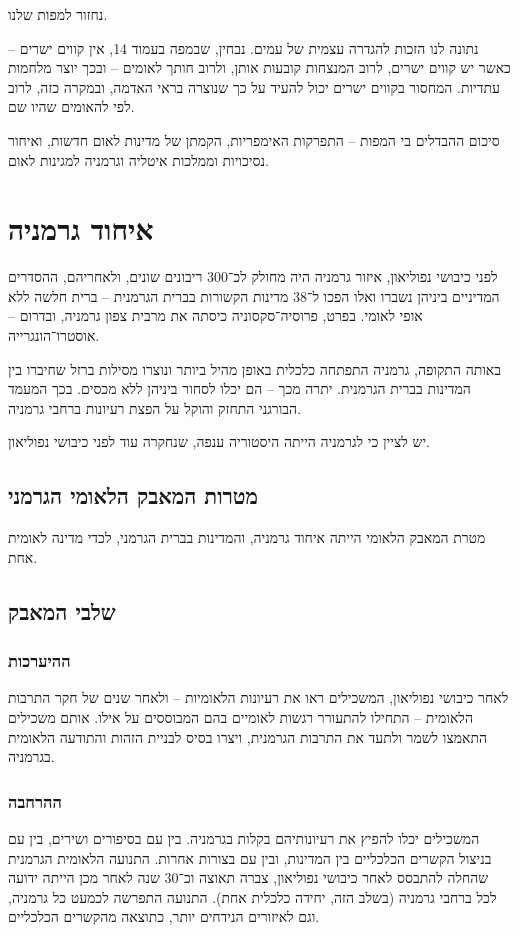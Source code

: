 \documentclass[a4paper]{book}
\begin{document}
	נחזור למפות שלנו. 
	
	נתונה לנו הזכות להגדרה עצמית של עמים. נבחין, שבמפה בעמוד 14, אין קווים ישרים – כאשר יש קווים ישרים, לרוב המנצחות קובעות אותן, ולרוב חותך לאומים – ובכך יוצר מלחמות עתדיות. המחסור בקווים ישרים יכול להעיד על כך שנוצרה בראי האדמה, ובמקרה כזה, לרוב לפי להאומים שהיו שם. 
	
	סיכום ההבדלים בי המפות – התפרקות האימפריות, הקמתן של מדינות לאום חדשות, ואיחור נסיכויות וממלכות איטליה וגרמניה למגינות לאום. 
	
	\section{איחוד גרמניה}
	לפני כיבושי נפוליאון, איזור גרמניה היה מחולק לכ־300 ריבונים שונים, ולאחריהם, ההסדרים המדיניים ביניהן נשברו ואלו הפכו ל־38 מדינות הקשורות בברית הגרמנית – ברית חלשה ללא אופי לאומי. בפרט, פרוסיה־סקסוניה כיסתה את מרבית צפון גרמניה, ובדרום – אוסטרו־הונגרייה. 
	
	באותה התקופה, גרמניה התפתחה כלכלית באופן מהיל ביותר ונוצרו מסילות ברזל שחיברו בין המדינות בברית הגרמנית. יתרה מכך – הם יכלו לסחור ביניהן ללא מכסים. בכך המעמד הבורגני התחזק והוקל על הפצת רעיונות ברחבי גרמניה. 
	
	יש לציין כי לגרמניה הייתה היסטוריה ענפה, שנחקרה עוד לפני כיבושי נפוליאון. 
	
	\subsection{מטרות המאבק הלאומי הגרמני}
	מטרת המאבק הלאומי הייתה איחוד גרמניה, והמדינות בברית הגרמני, לכדי מדינה לאומית אחת. 
	\subsection{שלבי המאבק}
	\subsubsection{ההיערכות}
	לאחר כיבושי נפוליאון, המשכילים ראו את רעיונות הלאומיות – ולאחר שנים של חקר התרבות הלאומית – התחילו להתעורר רגשות לאומיים בהם המבוססים על אילו. אותם משכילים התאמצו לשמר ולתעד את התרבות הגרמנית, ויצרו בסיס לבניית הזהות והתודעה הלאומית  בגרמניה. 
	
	\subsubsection{ההרחבה}
	המשכילים יכלו להפיץ את רעיונותיהם בקלות בגרמניה. בין עם בסיפורים ושירים, בין עם בניצול הקשרים הכלכליים בין המדינות, ובין עם בצורות אחרות. התנועה הלאומית הגרמנית שהחלה להתבסס לאחר כיבושי נפוליאון, צברה תאוצה וכ־30 שנה לאחר מכן הייתה ידועה לכל ברחבי גרמניה (בשלב הזה, יחידה כלכלית אחת). התנועה התפרשה לכמעט כל גרמניה, וגם לאיזורים הנידחים יותר, כתוצאה מהקשרים  הכלכליים.
\end{document}
